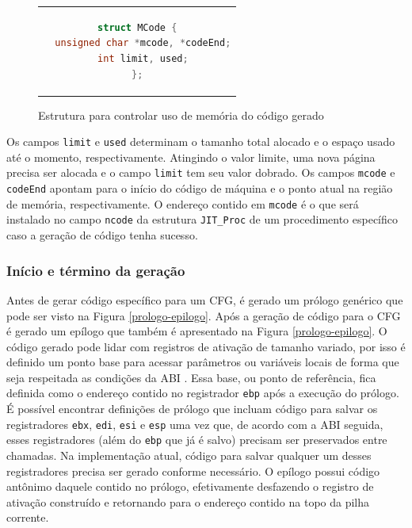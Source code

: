 \begin{figure}[h]
  \centering
  \begin{tabular}{c}
    \begin{lstlisting}[language=C]
struct MCode {
  unsigned char *mcode, *codeEnd;
  int limit, used;
};
    \end{lstlisting}
  \end{tabular}
  \caption{Estrutura para controlar uso de memória do código gerado\label{mcode-struct}}
\end{figure}

Os campos \verb!limit! e \verb!used! determinam o tamanho total
alocado e o espaço usado até o momento, respectivamente. Atingindo o
valor limite, uma nova página precisa ser alocada e o campo
\verb!limit! tem seu valor dobrado. Os campos \verb!mcode! e
\verb!codeEnd! apontam para o início do código de máquina e o
ponto atual na região de memória, respectivamente. O endereço contido em
\verb!mcode! é o que será instalado no campo
\verb!ncode! da estrutura \verb!JIT_Proc! de um procedimento
específico caso a geração de código tenha sucesso.


\subsubsection{Início e término da geração}
\label{begin-end-codegen}

Antes de gerar código específico para um CFG, é gerado um prólogo
genérico que pode ser visto na 
Figura \ref{prologo-epilogo}. Após a geração de código para o CFG é
gerado um epílogo que também é
apresentado na Figura \ref{prologo-epilogo}. O código gerado pode
lidar com registros de ativação de tamanho variado, por isso é
definido um ponto base para acessar
parâmetros ou variáveis locais de forma que seja respeitada as
condições da ABI \cite{systemv-abi}. Essa base, ou ponto de
referência, fica definida como 
o endereço contido no registrador \verb!ebp! após a execução do
prólogo. É possível encontrar definições de prólogo que incluam código
para salvar os registradores \verb!ebx!, \verb!edi!, \verb!esi!
e \verb!esp! uma vez que, de acordo com a ABI seguida, esses
registradores (além do \verb!ebp! que já é salvo) precisam ser
preservados entre chamadas. Na
implementação atual, código para salvar qualquer um desses
registradores precisa ser gerado conforme necessário. O epílogo possui
código antônimo daquele contido no prólogo, efetivamente desfazendo o
registro de ativação construído e retornando para o endereço contido
na topo da pilha corrente.


